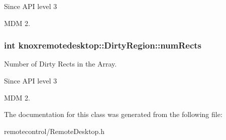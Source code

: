 \begin{DoxySince}{\-Since}
\-A\-P\-I level 3

\-M\-D\-M 2. 
\end{DoxySince}
\hypertarget{classknoxremotedesktop_1_1DirtyRegion_a433b848a889223e6b404cec9e8db0c7d}{
\subsubsection[{num\-Rects}]{\setlength{\rightskip}{0pt plus 5cm}int {\bf knoxremotedesktop\-::\-Dirty\-Region\-::num\-Rects}}}\label{classknoxremotedesktop_1_1DirtyRegion_a433b848a889223e6b404cec9e8db0c7d}


\-Number of \-Dirty \-Rects in the \-Array. 

\begin{DoxySince}{\-Since}
\-A\-P\-I level 3

\-M\-D\-M 2. 
\end{DoxySince}


\-The documentation for this class was generated from the following file\-:\begin{DoxyCompactItemize}
\item 
remotecontrol/\-Remote\-Desktop.\-h\end{DoxyCompactItemize}
